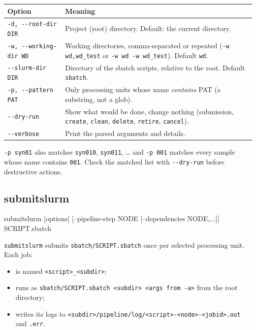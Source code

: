 \documentclass[11pt,a4paper]{article}
\newcommand{\cmd}[1]{\texttt{#1}}
\begin{document}
\begin{center}
\begin{tabularx}{\linewidth}{@{}l>{\raggedright\arraybackslash}X@{}}
\toprule
Option & Meaning \\
\midrule
\cmd{-d, -{}-root-dir DIR} & Project (root) directory. Default: the current directory. \\
\cmd{-w, -{}-working-dir WD} & Working directories, comma-separated or repeated (\cmd{-w wd,wd\_test} or \cmd{-w wd -w wd\_test}). Default \cmd{wd}. \\
\cmd{-{}-slurm-dir DIR} & Directory of the sbatch scripts, relative to the root. Default \cmd{sbatch}. \\
\cmd{-p, -{}-pattern PAT} & Only processing units whose name \emph{contains} PAT (a substring, not a glob). \\
\cmd{-{}-dry-run} & Show what would be done, change nothing (submission, \cmd{create}, \cmd{clean}, \cmd{delete}, \cmd{retire}, \cmd{cancel}). \\
\cmd{-{}-verbose} & Print the parsed arguments and details. \\
\bottomrule
\end{tabularx}
\end{center}

\begin{warning}
\cmd{-p syn01} also matches \cmd{syn010}, \cmd{syn011}, \ldots{} and \cmd{-p 001} matches every
sample whose name contains \cmd{001}. Check the matched list with \cmd{-{}-dry-run} before
destructive actions.
\end{warning}

\subsection{submitslurm}

\begin{terminal}
submitslurm [options] [--pipeline-step NODE [--dependencies NODE,...]] SCRIPT.sbatch
\end{terminal}

\cmd{submitslurm} submits \cmd{sbatch/SCRIPT.sbatch} once per selected processing unit. Each job:
\begin{itemize}
  \item is named \cmd{<script>\_<subdir>};
  \item runs as \cmd{sbatch/SCRIPT.sbatch <subdir> <args from -a>} from the root directory;
  \item writes its logs to \cmd{<subdir>/pipeline/log/<script>-<node>-<jobid>.out} and \cmd{.err}.
\end{itemize}
\end{document}
